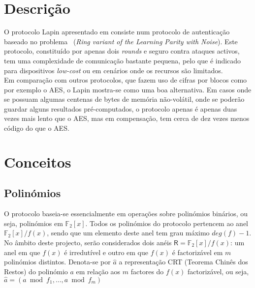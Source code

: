 \section{Descrição}
O protocolo Lapin apresentado em \cite{lapin} consiste num protocolo de autenticação baseado no problema \RingLPN\ (\textit{Ring variant of the Learning Parity with Noise}). Este protocolo, constituído por apenas dois \textit{rounds} e seguro contra ataques activos, tem uma complexidade de comunicação bastante pequena, pelo que é indicado para dispositivos \textit{low-cost} ou em cenários onde os recursos são limitados.\\
Em comparação com outros protocolos, que fazem uso de cifras por blocos como por exemplo o AES, o Lapin mostra-se como uma boa alternativa. Em casos onde se possuam algumas centenas de bytes de memória não-volátil, onde se poderão guardar alguns resultados pré-computados, o protocolo apenas é apenas duas vezes mais lento que o AES, mas em compensação, tem cerca de dez vezes menos código do que o AES.\\
\section{Conceitos}
\subsection{Polinómios}
O protocolo baseia-se essencialmente em operações sobre polinómios binários, ou seja, polinómios em $\mathbb{F}_2[x]$. Todos os polinómios do protocolo pertencem ao anel $\mathbb{F}_2[x]/f(x)$, sendo que um elemento deste anel tem grau máximo $deg(f)-1$. No âmbito deste projecto, serão considerados dois anéis $\mathsf{R} = \mathbb{F}_2[x]/f(x)$: um anel em que $f(x)$ é irredutível e outro em que $f(x)$ é factorizável em $m$ polinómios distintos. Denota-se por $\widehat{a}$ a representação CRT (Teorema Chinês dos Restos) do polinómio $a$ em relação aos $m$ factores do $f(x)$ factorizável, ou seja, $\widehat{a} = (a \bmod{f_1}, \dotsc, a \bmod{f_m})$\\
